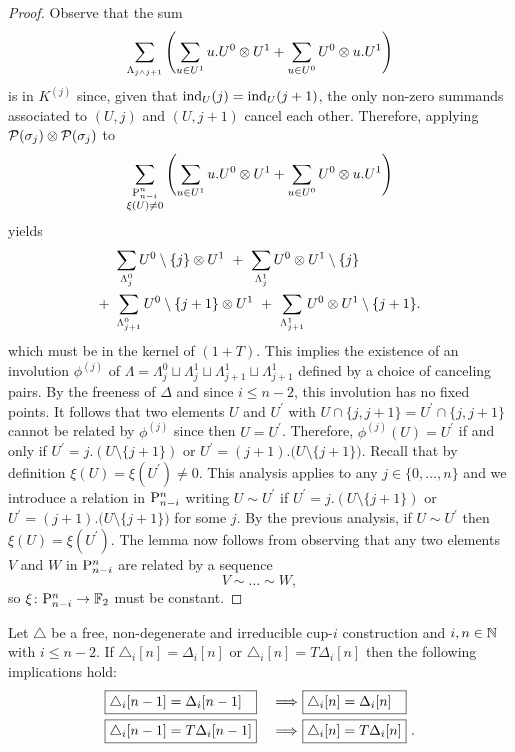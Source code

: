 \begin{proof}
	Observe that the sum
	\[
	\sum_{\Lambda_{j \wedge j+1}} \left( \sum_{u \in U^1} {u.U^0} \ot {U^1} +
	\sum_{u \in U^0} {U^0} \ot {u.U^1} \right)
	\]
	is in $K^{(j)}$ since, given that $\ind_U(j) = \ind_U(j+1)$, the only non-zero summands associated to $(U,j)$ and $(U,j+1)$ cancel each other.
	Therefore, applying $\cP(\sigma_j) \ot \cP(\sigma_j)$ to
	\[
	\sum_{\substack{\P_{n-i}^n \\ \xi(U) \neq 0}} \left(\sum_{u \in U^1} {u.U^0} \ot {U^1} +
	\sum_{u \in U^0} {U^0} \ot {u.U^1} \right)
	\]
	yields
	\begin{align*}
	&\sum_{\Lambda_{j}^0} U^0 \setminus \{j\} \ot {U^1} \ + \
	\sum_{\Lambda_{j}^1} U^0 \ot {U^1} \setminus \{j\} \\ + \
	&\sum_{\Lambda_{j+1}^0} U^0 \setminus \{j+1\} \ot {U^1} \ + \
	\sum_{\Lambda_{j+1}^1} U^0 \ot {U^1} \setminus \{j+1\}.
	\end{align*}
	which must be in the kernel of $(1+T)$.
	This implies the existence of an involution $\phi^{(j)}$ of $\Lambda = \Lambda^0_{j} \sqcup \Lambda^1_{j} \sqcup \Lambda^1_{j+1} \sqcup \Lambda^1_{j+1}$ defined by a choice of canceling pairs.
	By the freeness of $\Delta$ and since $i \leq n-2$, this involution has no fixed points.
	It follows that two elements $U$ and $U^\prime$ with $U \cap \{j, j+1\} = U^\prime \cap \{j, j+1\}$ cannot be related by $\phi^{(j)}$ since then $U = U^\prime$.
	Therefore, $\phi^{(j)}(U) = U^\prime$ if and only if $U^\prime = j.(U \setminus \{j+1\})$ or $U^\prime = (j+1).\big( U \setminus \{j+1\} \big)$.
	Recall that by definition $\xi(U) = \xi(U^\prime) \neq 0$.
	This analysis applies to any $j \in \{0, \dots, n\}$ and we introduce a relation in $\P_{n-i}^n$ writing $U \sim U^\prime$ if $U^\prime = j.(U \setminus \{j+1\})$ or $U^\prime = (j+1).\big( U \setminus \{j+1\} \big)$ for some $j$.
	By the previous analysis, if $U \sim U^\prime$ then $\xi(U) = \xi(U^\prime)$.
	The lemma now follows from observing that any two elements $V$ and $W$ in $\P_{n-i}^n$ are related by a sequence
	\[
	V \sim \dots \sim W,
	\]
	so $\xi \colon \P_{n-i}^n \to \F$ must be constant.
\end{proof}

\begin{lemma} \label{l:second nail}
	Let $\triangle$ be a free, non-degenerate and irreducible cup-$i$ construction and $i,n \in \N$ with $i \leq n-2$.
	If $\triangle_i [n] = \Delta_i [n]$ or $\triangle_i [n] = T \Delta_i [n]$ then the following implications hold:
	\begin{alignat*}{2}
	&\boxed{\triangle_i [n-1] = \Delta_i [n-1] \kern 7.3pt}\ &\Longrightarrow\
	&\boxed{\triangle_i [n] = \Delta_i [n] \kern 7.3pt} \\
	&\boxed{\triangle_i [n-1] = T \Delta_i [n-1]}\ &\Longrightarrow\
	&\boxed{\triangle_i [n] = T \Delta_i [n]} \ .
	\end{alignat*}
\end{lemma}

